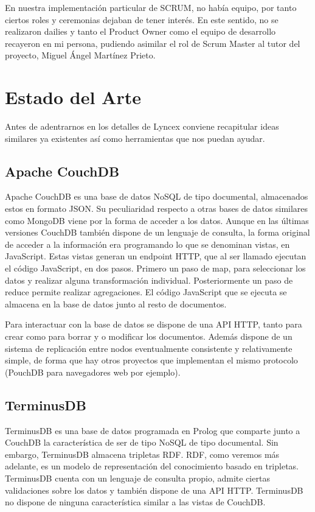 \documentclass[12pt]{report} %
\begin{document}
En nuestra implementación particular de SCRUM, no había equipo, por tanto ciertos roles y ceremonias dejaban de tener interés. 
En este sentido, no se realizaron dailies y tanto el Product Owner como el equipo de desarrollo recayeron en mi persona, pudiendo asimilar el rol de Scrum Master al tutor del proyecto, Miguel Ángel Martínez Prieto.

\chapter{Estado del Arte}

Antes de adentrarnos en los detalles de Lyncex conviene recapitular ideas similares ya existentes así como herramientas que nos puedan ayudar. 

\section{Apache CouchDB}
Apache CouchDB es una base de datos NoSQL de tipo documental, almacenados estos en formato JSON.\cite{couchdb}
Su peculiaridad respecto a otras bases de datos similares como MongoDB viene por la forma de acceder a los datos.
Aunque en las últimas versiones CouchDB también dispone de un lenguaje de consulta, la forma original de acceder a la información era programando lo que se denominan vistas, en JavaScript.
Estas vistas generan un endpoint HTTP, que al ser llamado ejecutan el código JavaScript, en dos pasos. Primero un paso de map, para seleccionar los datos y realizar alguna transformación individual.
Posteriormente un paso de reduce permite realizar agregaciones. El código JavaScript que se ejecuta se almacena en la base de datos junto al resto de documentos.

Para interactuar con la base de datos se dispone de una API HTTP, tanto para crear como para borrar y o modificar los documentos.
Además dispone de un sistema de replicación entre nodos eventualmente consistente y relativamente simple, de forma que hay otros proyectos que implementan el mismo protocolo (PouchDB para navegadores web por ejemplo).

\section{TerminusDB}
TerminusDB es una base de datos programada en Prolog que comparte junto a CouchDB la característica de ser de tipo NoSQL de tipo documental.\cite{terminusdb}
Sin embargo, TerminusDB almacena tripletas RDF. RDF, como veremos más adelante, es un modelo de representación del conocimiento basado en tripletas.
TerminusDB cuenta con un lenguaje de consulta propio, admite ciertas validaciones sobre los datos y también dispone de una API HTTP.
TerminusDB no dispone de ninguna característica similar a las vistas de CouchDB.
\end{document}
